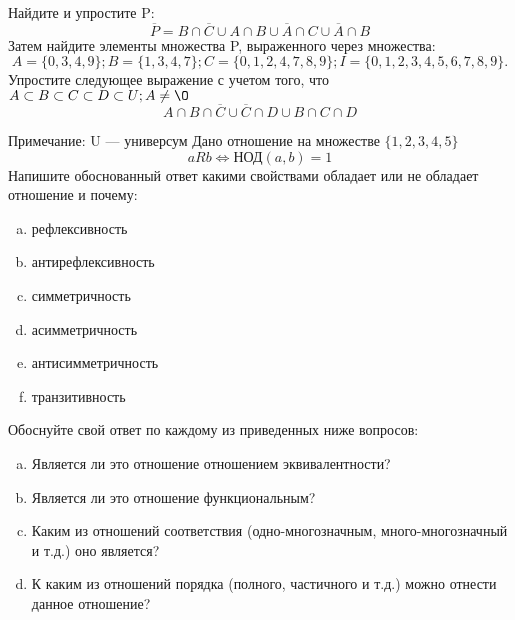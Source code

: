 \documentclass[10pt]{exam}
\begin{document}
\begin{questions}
\question
Найдите и упростите P:
\begin{equation*}
\overline{P} = B \cap \overline{C} \cup A \cap B \cup \overline{A} \cap C \cup \overline{A} \cap B
\end{equation*}
Затем найдите элементы множества P, выраженного через множества:
\begin{equation*}
A = \{0, 3, 4, 9\}; 
B = \{1, 3, 4, 7\};
C = \{0, 1, 2, 4, 7, 8, 9\};
I = \{0, 1, 2, 3, 4, 5, 6, 7, 8, 9\}.
\end{equation*}\question
Упростите следующее выражение с учетом того, что $A\subset B \subset C \subset D \subset U; A \neq \O$
\begin{equation*}
A \cap B  \cap \overline{C} \cup \overline{C} \cap D \cup B \cap C \cap D
\end{equation*}

Примечание: U — универсум\question
Дано отношение на множестве $\{1, 2, 3, 4, 5\}$ 
\begin{equation*}
aRb \iff  \text{НОД}(a,b) =1
\end{equation*}
Напишите обоснованный ответ какими свойствами обладает или не обладает отношение и почему:   
\begin{enumerate} [a)]\setcounter{enumi}{0}
\item рефлексивность
\item антирефлексивность
\item симметричность
\item асимметричность
\item антисимметричность
\item транзитивность
\end{enumerate}

Обоснуйте свой ответ по каждому из приведенных ниже вопросов:
\begin{enumerate} [a)]\setcounter{enumi}{0}
    \item Является ли это отношение отношением эквивалентности?
    \item Является ли это отношение функциональным?
    \item Каким из отношений соответствия (одно-многозначным, много-многозначный и т.д.) оно является?
    \item К каким из отношений порядка (полного, частичного и т.д.) можно отнести данное отношение?
\end{enumerate}



\end{questions}
\end{document}
